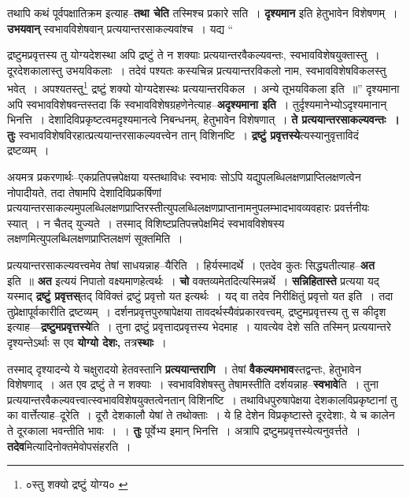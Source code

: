 \documentclass[article,12pt,a4paper]{memoir}
\begin{document}
	  \pstart तथापि कथं पूर्वपक्षातिक्रम इत्याह--\textbf{तथा चेति} तस्मिश्च प्रकारे सति । \textbf{दृश्यमान} इति हेतुभावेन विशेषणम् । \textbf{उभयवान्} स्वभावविशेषवान् प्रत्ययान्तरसाकल्यवांश्च । यद्य  \leavevmode{} “
	  
	द्रष्टुमप्रवृत्तस्य तु योग्यदेशस्था अपि द्रष्टुं ते न शक्याः प्रत्ययान्तरवैकल्यवन्तः, स्वभावविशेषयुक्तास्तु । दूरदेशकालास्तु उभयविकलाः । तदेवं पश्यतः कस्यचिन्न प्रत्ययान्तरविकलो नाम, स्वभावविशेषविकलस्तु भवेत् । अपश्यतस्तु\footnote{०स्तु शक्यो द्रष्टुं योग्य० \cite{dp-msA} \cite{dp-edP} \cite{dp-edH} \cite{dp-edE} \cite{dp-edN}} द्रष्टुं शक्यो योग्यदेशस्थः प्रत्ययान्तरविकल । अन्ये तूभयविकला इति ॥” दृश्यमाना अपि स्वभावविशेषवन्तस्तदा किं स्वभावविशेषग्रहणेनेत्याह--\textbf{अदृश्यमाना इति} । तुर्दृश्यमानेभ्योऽदृश्यमानान् भिनत्ति । देशादिविप्रकृष्टत्वमदृश्यमानत्वे निबन्धनम्, हेतुभावेन विशेषणात् । \textbf{ते प्रत्ययान्तरसाकल्यवन्तः । तुः} स्वभावविशेषविरहात्प्रत्ययान्तरसाकल्यवत्त्वेन तान् विशिनष्टि । \textbf{द्रष्टुं प्रवृत्तस्ये}त्यस्यानुवृत्ताविदं द्रष्टव्यम् ।
	\pend
      

	  \pstart अयमत्र प्रकरणार्थः--एकप्रतिपत्त्रपेक्षया यस्तथाविधः स्वभावः सोऽपि यद्युपलब्धिलक्षणप्राप्तिलक्षणत्वेन नोपादीयते, तदा तेषामपि देशादिविप्रकर्षिणां प्रत्ययान्तरसाकल्यमुपलब्धिलक्षणप्राप्तिरस्तीत्युपलब्धिलक्षणप्राप्तानामनुपलम्भादभावव्यवहारः प्रवर्त्तनीयः स्यात् । न चैतद् युज्यते । तस्माद् विशिष्टप्रतिपत्त्रपेक्षमिदं स्वभावविशेषस्य लक्षणमित्युपलब्धिलक्षणप्राप्तिलक्षणं सूक्तमिति ।
	\pend
      

	  \pstart प्रत्ययान्तरसाकल्यवत्त्वमेव तेषां साधयन्नाह--यैरिति । हिर्यस्मादर्थे । एतदेव कुतः सिद्ध्यतीत्याह--\textbf{अत} इति ॥ \textbf{अत} इत्ययं निपातो वक्ष्यमाणहेत्वर्थः । \textbf{चो} वक्तव्यमेतदित्यस्मिन्नर्थे । \textbf{सन्निहितास्ते} प्रत्यया यद् यस्माद् \textbf{द्रष्टुं प्रवृत्तस्}तद् विविक्तं द्रष्टुं प्रवृत्तो यत इत्यर्थः । यद् वा तदेव निरीक्षितुं प्रवृत्तो यत इति । तदा तु\leavevmode{}प्रेक्षापूर्वकारीति द्रष्टव्यम् । दर्शनप्रवृत्तपुरुषापेक्षया तावदर्थस्यैवंप्रकारवत्त्वम्, द्रष्टुमप्रवृत्तस्य तु स कीदृश इत्याह—\textbf{द्रष्टुमप्रवृत्तस्ये}ति । तुना द्रष्टुं प्रवृत्तादप्रवृत्तस्य भेदमाह । यावत्येव देशे सति तस्मिन् प्रत्ययान्तरे दृश्यन्तेऽर्थाः स एव \textbf{योग्यो देशः,} तत्र\textbf{स्थाः} ।
	\pend
      

	  \pstart तस्माद् दृश्यादन्ये ये चक्षुरादयो हेतवस्तानि \textbf{प्रत्ययान्तराणि} । तेषां \textbf{वैकल्यमभाव}स्तद्वन्तः, हेतुभावेन विशेषणाद् । अत एव द्रष्टुं ते न शक्याः । स्वभावविशेषस्तु तेषामस्तीति दर्शयन्नाह--\textbf{स्वभावे}ति । तुना प्रत्ययान्तरवैकल्यवत्त्वात्स्वभावविशेषयुक्तत्वेनतान् विशिनष्टि । तथाविधपुरुषापेक्षया देशकालविप्रकृष्टानां तु का वार्त्तेत्याह--दूरेति । दूरौ देशकालौ येषां ते तथोक्ताः । ये हि देशेन विप्रकृष्टास्ते दूरदेशाः, ये च कालेन ते दूरकाला भवन्तीति भावः । । \textbf{तुः} पूर्वेभ्य इमान् भिनत्ति । अत्रापि द्रष्टुमप्रवृत्तस्येत्यनुवर्त्तते । \textbf{तदेव}मित्यादिनोक्तमेवोपसंहरति ।
	\pend
      
\end{document}
